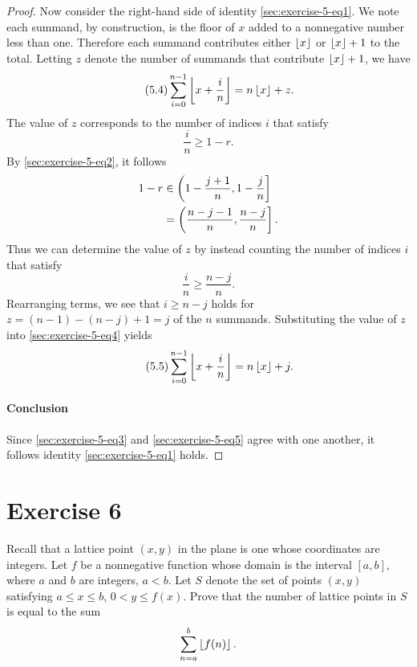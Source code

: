 \documentclass{article}
\begin{document}
\begin{proof}
    Now consider the right-hand side of identity \eqref{sec:exercise-5-eq1}.
    We note each summand, by construction, is the floor of $x$ added to a
      nonnegative number less than one.
    Therefore each summand contributes either $\left\lfloor x\right\rfloor$ or $\left\lfloor x\right\rfloor + 1$ to
      the total.
    Letting $z$ denote the number of summands that contribute $\left\lfloor x\right\rfloor + 1$,
      we have
      \begin{equation}
        \label{sec:exercise-5-eq4}
        \tag{5.4}
        \sum_{i=0}^{n-1} \left\lfloor x + \frac{i}{n}\right\rfloor = n\left\lfloor x\right\rfloor + z.
      \end{equation}
    The value of $z$ corresponds to the number of indices $i$ that satisfy
      $$\frac{i}{n} \geq 1 - r.$$
    By \eqref{sec:exercise-5-eq2}, it follows
      \begin{align*}
        1 - r
          & \in \left(1 - \frac{j+1}{n}, 1-\frac{j}{n}\right] \\
          & = \left(\frac{n - j - 1}{n}, \frac{n - j}{n}\right].
      \end{align*}
    Thus we can determine the value of $z$ by instead counting the number of
      indices $i$ that satisfy $$\frac{i}{n} \geq \frac{n - j}{n}.$$
    Rearranging terms, we see that $i \geq n - j$ holds for
      $z = (n - 1) - (n - j) + 1 = j$ of the $n$ summands.
    Substituting the value of $z$ into \eqref{sec:exercise-5-eq4} yields
      \begin{equation}
        \label{sec:exercise-5-eq5}
        \tag{5.5}
        \sum_{i=0}^{n-1} \left\lfloor x + \frac{i}{n}\right\rfloor = n\left\lfloor x\right\rfloor + j.
      \end{equation}

  \paragraph{Conclusion}%

    Since \eqref{sec:exercise-5-eq3} and \eqref{sec:exercise-5-eq5} agree with
    one another, it follows identity \eqref{sec:exercise-5-eq1} holds.

\end{proof}

\section{Exercise 6}%
\label{sec:exercise-6}

Recall that a lattice point $(x, y)$ in the plane is one whose coordinates are
  integers.
Let $f$ be a nonnegative function whose domain is the interval $[a, b]$, where
  $a$ and $b$ are integers, $a < b$.
Let $S$ denote the set of points $(x, y)$ satisfying $a \leq x \leq b$,
  $0 < y \leq f(x)$.
Prove that the number of lattice points in $S$ is equal to the sum
  $$\sum_{n=a}^b \left\lfloor f(n)\right\rfloor.$$
\end{document}
